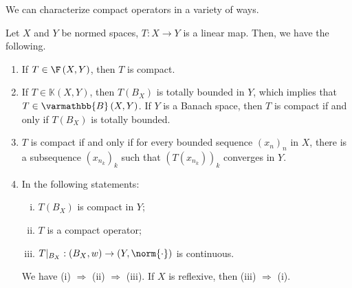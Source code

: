 \documentclass[10pt]{mypackage}
\renewcommand*{\mathbb}[1]{\varmathbb{#1}}
\newcommand{\B}{\mathbb{B}}
\begin{document}
We can characterize compact operators in a variety of ways.
\begin{proposition}
  Let $X$ and $Y$ be normed spaces, $T: X\rightarrow Y$ is a linear map. Then, we have the following.
  \begin{enumerate}[(1)]
    \item If $T\in \F\left(X,Y\right)$, then $T$ is compact.
    \item If $T\in \mathds{K}\left(X,Y\right)$, then $T\left(B_X\right)$ is totally bounded in $Y$, which implies that $T\in \B\left(X,Y\right)$. If $Y$ is a Banach space, then $T$ is compact if and only if $T\left(B_X\right)$ is totally bounded.
    \item $T$ is compact if and only if for every bounded sequence $\left(x_n\right)_n$ in $X$, there is a subsequence $\left(x_{n_k}\right)_{k}$ such that $\left(T\left(x_{n_k}\right)\right)_{k}$ converges in $Y$.
    \item In the following statements:
      \begin{enumerate}[(i)]
        \item $T\left(B_X\right)$ is compact in $Y$;
        \item $T$ is a compact operator;
        \item $T|_{B_X}: \left(B_{X},w\right)\rightarrow \left(Y,\norm{\cdot}\right)$ is continuous.
      \end{enumerate}
      We have (i) $\Rightarrow$ (ii) $\Rightarrow$ (iii). If $X$ is reflexive, then (iii) $\Rightarrow$ (i).
  \end{enumerate}
\end{proposition}
\end{document}
